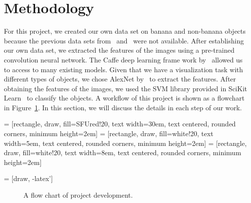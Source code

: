 \documentclass{article} %
\begin{document}
\section{Methodology}
\label{sec:method}
For this project, we created our own data set on banana and non-banana objects because the previous data sets from~\citet{saad2009recognizing} and~\citet{paulraj2009color} were not available. After establishing our own data set, we extracted the features of the images using a pre-trained convolution neural network. The Caffe deep learning frame work by~\citet{jia2014caffe} allowed us to access to many existing models. Given that we have a visualization task with different types of objects, we chose AlexNet by~\citet{krizhevsky2012imagenet} to extract the features. After obtaining the features of the images, we used the SVM library provided in SciKit Learn~\citep{scikit-learn} to classify the objects. A workflow of this project is shown as a flowchart in Figure~\ref{fig:flowchart}. In this section, we will discuss the details in each step of our work. 

 = [rectangle, draw, fill=SFUred!20, 
    text width=30em, text centered, rounded corners, minimum height=2em]
     = [rectangle, draw, fill=white!20, 
    text width=5em, text centered, rounded corners, minimum height=2em]
         = [rectangle, draw, fill=white!20, 
    text width=8em, text centered, rounded corners, minimum height=2em]

 = [draw, -latex']

\begin{figure} [h]
\centering 
{
}
\caption{A flow chart of project development.}
\label{fig:flowchart}
 \end{figure}
\end{document}
